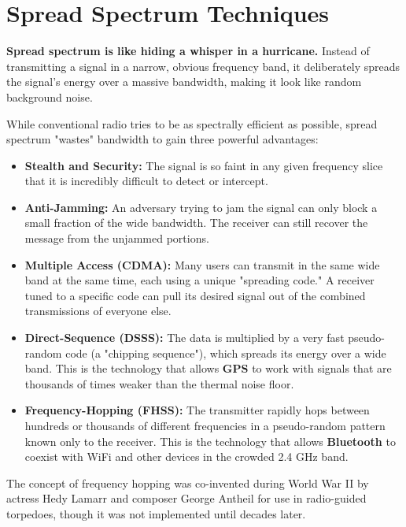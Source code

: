 
\chapter{Spread Spectrum Techniques}
\label{ch:spread-spectrum}

\begin{nontechnical}
    \textbf{Spread spectrum is like hiding a whisper in a hurricane.} Instead of transmitting a signal in a narrow, obvious frequency band, it deliberately spreads the signal's energy over a massive bandwidth, making it look like random background noise.

    While conventional radio tries to be as spectrally efficient as possible, spread spectrum "wastes" bandwidth to gain three powerful advantages:
    \begin{itemize}
        \item \textbf{Stealth and Security:} The signal is so faint in any given frequency slice that it is incredibly difficult to detect or intercept.
        \item \textbf{Anti-Jamming:} An adversary trying to jam the signal can only block a small fraction of the wide bandwidth. The receiver can still recover the message from the unjammed portions.
        \item \textbf{Multiple Access (CDMA):} Many users can transmit in the same wide band at the same time, each using a unique "spreading code." A receiver tuned to a specific code can pull its desired signal out of the combined transmissions of everyone else.
    \end{itemize}

    \begin{itemize}
        \item \textbf{Direct-Sequence (DSSS):} The data is multiplied by a very fast pseudo-random code (a "chipping sequence"), which spreads its energy over a wide band. This is the technology that allows \textbf{GPS} to work with signals that are thousands of times weaker than the thermal noise floor.
        \item \textbf{Frequency-Hopping (FHSS):} The transmitter rapidly hops between hundreds or thousands of different frequencies in a pseudo-random pattern known only to the receiver. This is the technology that allows \textbf{Bluetooth} to coexist with WiFi and other devices in the crowded 2.4 GHz band.
    \end{itemize}
    
     The concept of frequency hopping was co-invented during World War II by actress Hedy Lamarr and composer George Antheil for use in radio-guided torpedoes, though it was not implemented until decades later.
\end{nontechnical}


